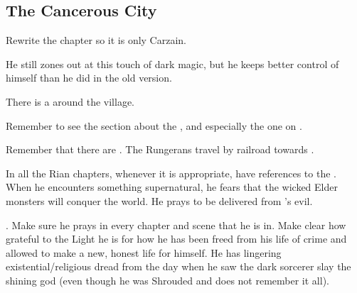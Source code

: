 \subsection{The Cancerous City}
\begin{changes}
  \begin{comment}
  \paragraph{The Terror of \EreshKal}
  \end{comment}
    Rewrite the chapter so it is only Carzain.
    
    He still zones out at this touch of dark magic, but he keeps better control of himself than he did in the old version. 
  
    There is a  around the village. 

    Remember to see the section about the , and especially the one on . 
    
    Remember that there are . 
    The Rungerans travel by railroad towards \Forclin. 
  
  \begin{comment}
  \paragraph{The \Qliphoth Lie Ever in Wait}
  \end{comment}
    
    In all the Rian chapters, whenever it is appropriate, have references to the . 
    When he encounters something supernatural, he fears that the wicked Elder monsters will conquer the world. 
    He prays to be delivered from \Isphet's evil. 
    
    .
    Make sure he prays in every chapter and scene that he is in.
    Make clear how grateful to the Light he is for how he has been freed from his life of crime and allowed to make a new, honest life for himself.
    He has lingering existential/religious dread from the day when he saw the dark sorcerer slay the shining god (even though he was Shrouded and does not remember it all). 
  

\end{changes}
